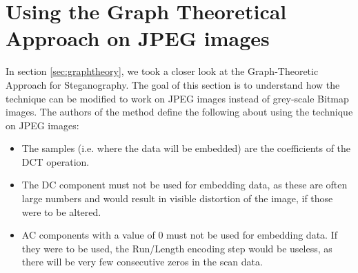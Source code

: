 \section{Using the Graph Theoretical Approach on JPEG images}
\label{sec:graphJPEG}
In section \ref{sec:graphtheory}, we took a closer look at the Graph-Theoretic Approach for Steganography. 
The goal of this section is to understand how the technique can be modified to work on JPEG images instead of grey-scale Bitmap images. 
The authors of the method define the following about using the technique on JPEG images\citep{hetzl_2005}:

\begin{itemize}
    \item The samples (i.e. 
    where the data will be embedded) are the coefficients of the DCT operation. 
    \item The DC component must not be used for embedding data, as these are often large numbers and would result in visible distortion of the image, if those were to be altered.
    \item AC components with a value of 0 must not be used for embedding data.
    If they were to be used, the Run/Length encoding step would be useless, as there will be very few consecutive zeros in the scan data.
\end{itemize}

